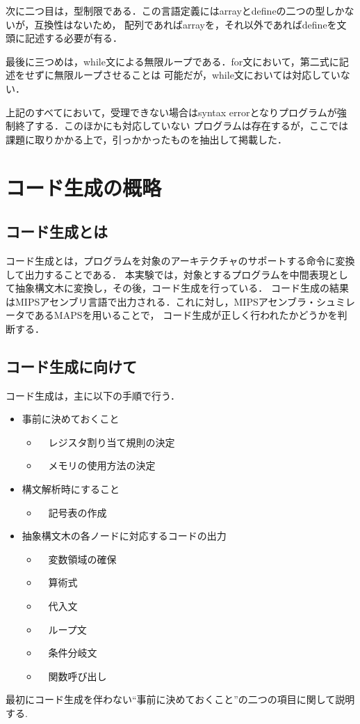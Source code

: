 \documentclass[a4paper,11pt]{jarticle}
\begin{document}
{次に二つ目は，型制限である．この言語定義にはarrayとdefineの二つの型しかないが，互換性はないため，
配列であればarrayを，それ以外であればdefineを文頭に記述する必要が有る．

最後に三つめは，while文による無限ループである．for文において，第二式に記述をせずに無限ループさせることは
可能だが，while文においては対応していない．

上記のすべてにおいて，受理できない場合はsyntax errorとなりプログラムが強制終了する．このほかにも対応していない
プログラムは存在するが，ここでは課題に取りかかる上で，引っかかったものを抽出して掲載した．

\section{コード生成の概略}
\subsection{コード生成とは}
コード生成とは，プログラムを対象のアーキテクチャのサポートする命令に変換して出力することである．
本実験では，対象とするプログラムを中間表現として抽象構文木に変換し，その後，コード生成を行っている．
コード生成の結果はMIPSアセンブリ言語で出力される．これに対し，MIPSアセンブラ・シュミレータであるMAPSを用いることで，
コード生成が正しく行われたかどうかを判断する．

\subsection{コード生成に向けて}
コード生成は，主に以下の手順で行う．
\begin{itemize}
  \item 事前に決めておくこと
    \begin{itemize}
       \item　レジスタ割り当て規則の決定
       \item　メモリの使用方法の決定
    \end{itemize}
  \item 構文解析時にすること
    \begin{itemize}
       \item　記号表の作成
    \end{itemize}
  \item 抽象構文木の各ノードに対応するコードの出力
    \begin{itemize}
       \item　変数領域の確保
       \item　算術式
       \item　代入文
       \item　ループ文
       \item　条件分岐文
       \item　関数呼び出し
    \end{itemize}
\end{itemize}
最初にコード生成を伴わない``事前に決めておくこと''の二つの項目に関して説明する. 

}
\end{document}
